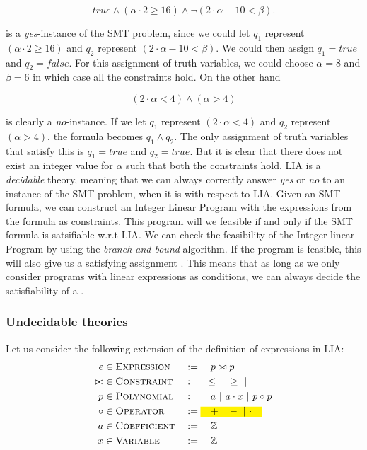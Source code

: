 	\begin{equation*}	
	true \land (\alpha \cdot 2 \geq 16) \land \neg (2\cdot \alpha - 10 < \beta).
	\end{equation*}

	is a \emph{yes}-instance of the SMT problem, since we could let $q_1$ represent $(\alpha \cdot 2 \geq 16)$ and $q_2$ represent $(2\cdot \alpha - 10 < \beta)$. We could then assign $q_1 = true$ and $q_2 = false$. For this assignment of truth variables, we could choose $\alpha = 8$ and $\beta = 6$ in which case all the constraints hold. On the other hand 
	
	\begin{equation*}
		(2\cdot \alpha < 4) \land (\alpha > 4)
	\end{equation*}
	
	is clearly a \emph{no}-instance. If we let $q_1$ represent $(2\cdot \alpha < 4)$ and $q_2$ represent $(\alpha > 4)$, the formula becomes $q_1\land q_2$. The only assignment of truth variables that satisfy this is $q_1 = true$ and $q_2 = true$. But it is clear that there does not exist an integer value for $\alpha$ such that both the constraints hold. LIA is a \emph{decidable} theory, meaning that we can always correctly answer \emph{yes} or \emph{no} to an instance of the SMT problem, when it is with respect to LIA. Given an SMT formula, we can construct an Integer Linear Program with the expressions from the formula as constraints. This program will we feasible if and only if the SMT formula is satsifiable w.r.t LIA. We can check the feasibility of the Integer linear Program by using the \emph{branch-and-bound} algorithm. If the program is feasible, this will also give us a satisfying assignment \cite{Vanderbei01linearprogramming:}. This means that as long as we only consider programs with linear expressions as conditions, we can always decide the satisfiability of a \pc.
	
	\subsubsection{Undecidable theories}
	Let us consider the following extension of the definition of expressions in LIA:
	\begin{alignat*}{3}
		e & \in \textsc{Expression} && := \quad p \bowtie p\\
		\bowtie & \in \textsc{Constraint} && := \quad \leq \alt \geq \alt =\\
		p & \in \textsc{Polynomial} && := \quad a \alt a\cdot x \alt p \circ p\\
		\circ & \in \textsc{Operator} && := \text{\hl{$\quad + \alt - \alt \cdot \quad$}} \\
		a & \in \textsc{Coefficient} && := \quad \mathbb{Z}\\
		x & \in \textsc{Variable} && := \quad \mathbb{Z}
	\end{alignat*}
	
